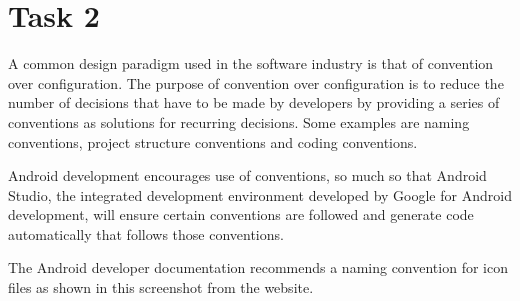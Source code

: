 \documentclass[11pt,english,numbers=endperiod,parskip=half]{scrartcl}
\begin{document}
\section{Task 2}
\raggedright
A common design paradigm used in the software industry is that of convention over configuration. The purpose of convention over configuration is to reduce the number of decisions that have to be made by developers by providing a series of conventions as solutions for recurring decisions. Some examples are naming conventions, project structure conventions and coding conventions.

Android development encourages use of conventions, so much so that Android Studio, the integrated development environment developed by Google for Android development, will ensure certain conventions are followed and generate code automatically that follows those conventions.

The Android developer documentation recommends a naming convention for icon files as shown in this screenshot from the website.
\end{document}
